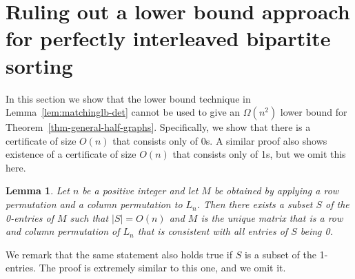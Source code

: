 \documentclass[11pt]{article}
\newtheorem{lemma}[theorem]{Lemma}
\begin{document}
\section{Ruling out a lower bound approach for perfectly interleaved bipartite sorting}\label{appedix-rule-out-lower-bound-approach}
In this section we show that the lower bound technique in Lemma~\ref{lem:matchinglb-det} cannot be used to give an $\Omega(n^2)$ lower bound for Theorem~\ref{thm-general-half-graphs}. Specifically, we show that there is a certificate of size $O(n)$ that consists only of 0s. A similar proof also shows existence of a certificate of size $O(n)$ that consists only of 1s, but we omit this here.
\begin{lemma}\label{lem: inductive proof}
    Let $n$ be a positive integer and let $M$ be obtained by applying a row permutation and a column permutation to $L_n$. Then there exists a subset $S$ of the 0-entries of $M$ such that $|S| = O(n)$ and $M$ is the unique matrix that is a row and column permutation of $L_n$ that is consistent with all entries of $S$ being 0.
\end{lemma}
We remark that the same statement also holds true if $S$ is a subset of the 1-entries. The proof is extremely similar to this one, and we omit it.
\end{document}
